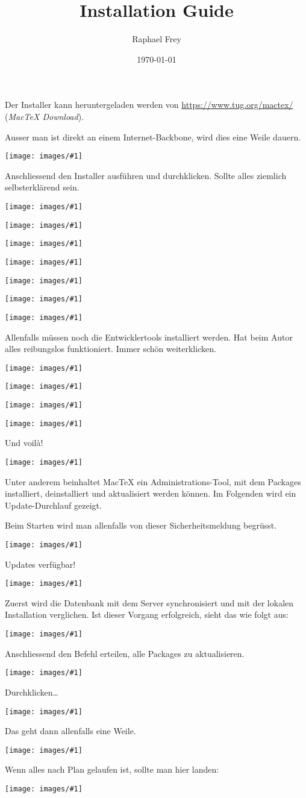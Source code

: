 \documentclass[a4paper,11pt]{article}
\title{\mt{} Installation Guide}
\author{Raphael Frey}
\date{\today}
\def\mt{Mac\TeX}
\newcommand{\screenshot}[1]{%
    \noindent\begin{minipage}{\textwidth}
        \vspace{1em}
        \centering
        \texttt{[image: images/\#1]}
        \vspace{1em}
    \end{minipage}}
\begin{document}
\maketitle

Der Installer kann heruntergeladen werden von
\href{https://www.tug.org/mactex/}{https://www.tug.org/mactex/}
(\emph{MacTeX Download}).



Ausser man ist direkt an einem Internet-Backbone, wird dies eine Weile dauern.

\screenshot{mactex01.png}

Anschliessend  den   Installer  ausf\"uhren  und   durchklicken. Sollte  alles
ziemlich selbsterkl\"arend sein.

\screenshot{mactex02.png}
\screenshot{mactex03.png}
\screenshot{mactex04.png}
\screenshot{mactex05.png}
\screenshot{mactex06.png}
\screenshot{mactex07.png}
\screenshot{mactex08.png}

\newpage
Allenfalls  m\"ussen noch  die  Entwicklertools  installiert werden. Hat  beim
Autor alles reibungslos funktioniert. Immer sch\"on weiterklicken.

\screenshot{mactex09.png}
\screenshot{mactex10.png}
\screenshot{mactex11.png}
\screenshot{mactex12.png}

\newpage
Und voil\`a!

\screenshot{mactex13.png}

Unter  anderem beinhaltet  \mt{}  ein Administrations-Tool,  mit dem  Packages
installiert, deinstalliert und aktualisiert werden k\"onnen. Im Folgenden wird
ein Update-Durchlauf gezeigt.

\vspace{1em}
Beim Starten wird man allenfalls von dieser Sicherheitsmeldung begr\"usst.

\screenshot{mactex14.png}

\newpage
Updates verf\"ugbar!

\screenshot{mactex15.png}

Zuerst wird  die Datenbank mit dem  Server synchronisiert und mit  der lokalen
Installation verglichen. Ist  dieser Vorgang erfolgreich, sieht  das wie folgt
aus:

\screenshot{mactex16.png}

\newpage
Anschliessend den Befehl erteilen, alle Packages zu aktualisieren.

\screenshot{mactex17.png}

Durchklicken\ldots

\screenshot{mactex18.png}

\newpage
Das geht dann allenfalls eine Weile.

\screenshot{mactex21.png}

\vspace{1em}
Wenn alles nach Plan gelaufen ist, sollte man hier landen:

\screenshot{mactex22.png}

\end{document}

